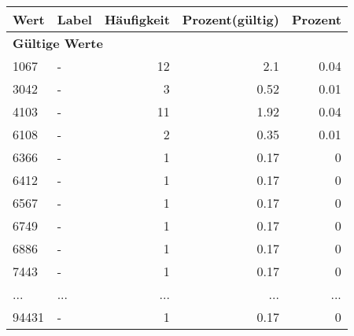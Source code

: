      \begin{longtable}{lXrrr}
     \toprule
     \textbf{Wert} & \textbf{Label} & \textbf{Häufigkeit} & \textbf{Prozent(gültig)} & \textbf{Prozent} \\
     \endhead
     \midrule
     \multicolumn{5}{l}{\textbf{Gültige Werte}}\\
        1067 & \multicolumn{1}{X}{-} & %
          \num{12} &
          \num[round-mode=places,round-precision=2]{2.1} &
          \num[round-mode=places,round-precision=2]{0.04} \\
        3042 & \multicolumn{1}{X}{-} & %
          \num{3} &
          \num[round-mode=places,round-precision=2]{0.52} &
          \num[round-mode=places,round-precision=2]{0.01} \\
        4103 & \multicolumn{1}{X}{-} & %
          \num{11} &
          \num[round-mode=places,round-precision=2]{1.92} &
          \num[round-mode=places,round-precision=2]{0.04} \\
        6108 & \multicolumn{1}{X}{-} & %
          \num{2} &
          \num[round-mode=places,round-precision=2]{0.35} &
          \num[round-mode=places,round-precision=2]{0.01} \\
        6366 & \multicolumn{1}{X}{-} & %
          \num{1} &
          \num[round-mode=places,round-precision=2]{0.17} &
          \num[round-mode=places,round-precision=2]{0} \\
        6412 & \multicolumn{1}{X}{-} & %
          \num{1} &
          \num[round-mode=places,round-precision=2]{0.17} &
          \num[round-mode=places,round-precision=2]{0} \\
        6567 & \multicolumn{1}{X}{-} & %
          \num{1} &
          \num[round-mode=places,round-precision=2]{0.17} &
          \num[round-mode=places,round-precision=2]{0} \\
        6749 & \multicolumn{1}{X}{-} & %
          \num{1} &
          \num[round-mode=places,round-precision=2]{0.17} &
          \num[round-mode=places,round-precision=2]{0} \\
        6886 & \multicolumn{1}{X}{-} & %
          \num{1} &
          \num[round-mode=places,round-precision=2]{0.17} &
          \num[round-mode=places,round-precision=2]{0} \\
        7443 & \multicolumn{1}{X}{-} & %
          \num{1} &
          \num[round-mode=places,round-precision=2]{0.17} &
          \num[round-mode=places,round-precision=2]{0} \\
       ... & ... & ... & ... & ... \\
        94431 & \multicolumn{1}{X}{-} & %
          \num{1} &
          \num[round-mode=places,round-precision=2]{0.17} &
          \num[round-mode=places,round-precision=2]{0} \\


\end{longtable}
